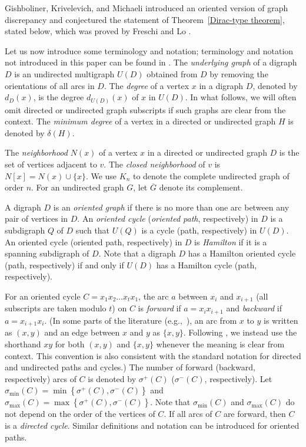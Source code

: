 \documentclass[11pt]{article}
\newcommand{\GGr}[1]{{#1}}
\newcommand{\QGr}[1]{{#1}}
\newcommand{\GG}[1]{{#1}}
\newcommand{\QG}[1]{{#1}}
\newcommand{\2}{\vspace{0.2cm}}
\begin{document}
Gishboliner, Krivelevich, and Michaeli \cite{GKM23} introduced \GGr{an} oriented version of graph discrepancy and conjectured the \GGr{statement} of Theorem~\ref{Dirac-type theorem}, stated below, \GGr{which was} proved by Freschi and Lo \cite{FL24}.

Let us now introduce some terminology and notation; terminology and notation not introduced in this paper can be found in \cite{BG00,BG18,BM08}.
The {\em underlying graph} of a digraph $D$ is an undirected \GG{multigraph $U(D)$ obtained from $D$ by removing the orientations of all arcs in $D$.} \QG{The {\em degree} of a vertex $x$ in a digraph $D$, denoted by $d_D(x)$, is the degree $d_{U(D)}(x)$ of $x$ in $U(D)$. }In what follows, we will often omit directed or undirected graph subscripts if such graphs are clear from the context. The \emph{minimum degree} of a vertex in a directed or undirected graph $H$ is denoted by $\delta(H)$. 

 The \emph{neighborhood} $N(x)$ of a vertex $x$ in a directed or undirected graph $D$ is the set of vertices adjacent to $v$. The \emph{closed neighborhood} of $v$ is $N[x]=N(x)\cup \{x\}$. \QGr{We use $K_n$ to denote the complete undirected graph of order $n$.  For an undirected graph $G$, let $\overline{G}$ denote its complement. }

A digraph $D$ is an {\em oriented graph} if there is no more than one arc between any pair of vertices in $D$. \GG{An {\em oriented cycle} ({\em oriented path}, respectively) in $D$ is a subdigraph $Q$ of $D$ such that $U(Q)$ is a cycle (path, respectively) in $U(D)$.}
 An oriented cycle (oriented path, respectively) in $D$ is \emph{Hamilton} if it is a spanning subdigraph of $D$. Note that a digraph $D$ has a Hamilton oriented cycle (path, respectively) if and only if $U(D)$ has a Hamilton cycle (path, respectively). 

For an oriented cycle  $C=x_1x_2\dots x_tx_1$, the arc $a$ between $x_i$ and $x_{i+1}$ (all subscripts are taken modulo $t$) on $C$ is \emph{forward} if $a=x_ix_{i+1}$ and  \emph{backward} if $a=x_{i+1}x_{i}$.  \GGr{(In some parts of the literature (e.g.,~\cite{GKM23}), an arc from $x$ to $y$ is written as $(x,y)$ and an edge between $x$ and $y$ as $\{x,y\}$. Following \cite{FL24}, we instead use the shorthand $xy$ for both $(x,y)$ and $\{x,y\}$ whenever the meaning is clear from context. This convention is also consistent with the standard notation for directed and undirected paths and cycles.)}
The number of forward (backward, respectively) arcs of $C$ is denoted by $\sigma^+(C)$ ($\sigma^-(C)$, respectively).
Let $\sigma_{\min}(C)=\min \left \{\sigma^+(C), \sigma^-(C)\right \}$ and $\sigma_{\max}(C)=\max \left \{\sigma^+(C),\sigma^-(C)\right \}$. Note that $\sigma_{\min}(C)$ and $\sigma_{\max}(C)$  do not depend on the order of the vertices of $C$. If all arcs of $C$ are forward, then $C$ is a {\em directed cycle}. Similar definitions and notation can be introduced for oriented paths.
\end{document}
